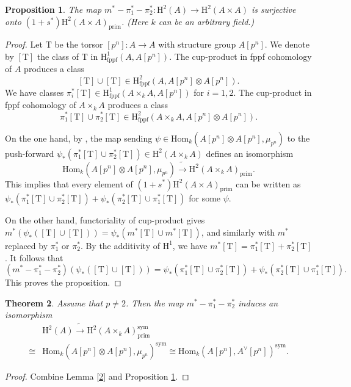 \documentclass[a4paper,12pt,twoside]{report}
\newtheorem{theorem}{Theorem}[section]
\newtheorem{proposition}[theorem]{Proposition}
\newcommand{\fppf}{\mathrm{fppf}}
\newcommand{\prim}{\mathrm{prim}}
\newcommand{\HH}{\mathrm{H}}
\newcommand{\Hom}{\mathrm{Hom}}
\newcommand{\sym}{\mathrm{sym}}
\newcommand{\T}{\mathrm{T}}
\begin{document}
\begin{proposition}\label{3}
The map $m^*-\pi_1^*-\pi_2^*\colon \HH^2(A)\to \HH^2(A\times A)$ is surjective onto 
$(1+s^*)\HH^2(A\times A)_\prim$. (Here $k$ can be an arbitrary field.)
\end{proposition}

\begin{proof}
    Let $\T$ be the torsor $[p^n]\colon A\to A$ with structure group $A[p^n]$.
We denote by $[\T]$ the class of $\T$ in $\HH^1_\fppf(A,A[p^n])$.
The cup-product in fppf cohomology of $A$ produces a class
$$[\T]\cup[\T]\in\HH^2_\fppf(A,A[p^n]\otimes A[p^n]).$$
We have classes $\pi_i^*[\T]\in\HH^1_\fppf(A\times_kA,A[p^n])$ for $i=1,2$.
The cup-product in fppf cohomology of $A\times_kA$ produces a class
$$\pi_1^*[\T] \cup \pi_2^*[\T]\in \HH^2_\fppf(A\times_kA,A[p^n]\otimes A[p^n]).$$

On the one hand, by \cite[Proposition  1.3]{Sk}, the map sending
$\psi\in\Hom_k(A[p^n]\otimes A[p^n],\mu_{p^n})$ to the push-forward
$\psi_*(\pi_1^*[\T] \cup \pi_2^*[\T])\in\HH^2(A\times_kA)$
defines an isomorphism
$$\Hom_k(A[p^n]\otimes A[p^n],\mu_{p^n})\tilde\longrightarrow\HH^2(A\times_kA)_\prim.$$
This implies that every element of $(1+s^*)\HH^2(A\times A)_\prim$ can be written as 
$\psi_*(\pi_1^*[\T] \cup \pi_2^*[\T])+\psi_*(\pi_2^*[\T] \cup \pi_1^*[\T])$ for some
$\psi$.

On the other hand, functoriality of cup-product gives
$m^*(\psi_*([\T] \cup [\T]))=\psi_*(m^*[\T]\cup m^*[\T])$, and similarly with $m^*$ replaced by 
$\pi_1^*$ or $\pi_2^*$. By the additivity of $\HH^1$, we have
$m^*[\T]=\pi_1^*[\T]+\pi_2^*[\T]$. It follows that
$$(m^*-\pi_1^*-\pi_2^*)(\psi_*([\T]\cup[\T]))=\psi_*(\pi_1^*[\T]\cup\pi_2^*[\T])+
\psi_*(\pi_2^*[\T]\cup\pi_1^*[\T]).$$
This proves the proposition.
\end{proof}
\begin{theorem}\label{1}
Assume that $p\neq 2$. Then the map $m^*-\pi_1^*-\pi_2^*$ induces an
isomorphism
\[\begin{aligned}
    &\HH^2(A)\tilde\longrightarrow\HH^2(A\times_kA)_\prim^\sym\\
    \cong&\Hom_k(A[p^n]\otimes A[p^n],\mu_{p^n})^\sym\cong\Hom_k(A[p^n],A^\vee[p^n])^\sym.
\end{aligned}\]
\end{theorem}
\begin{proof}
    Combine Lemma \ref{2} and Proposition \ref{3}.
\end{proof}
\end{document}
